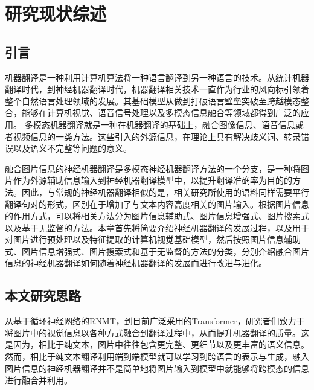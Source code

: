 \chapter{研究现状综述}\label{chap:relatedwork}

\section{引言}
机器翻译是一种利用计算机算法将一种语言翻译到另一种语言的技术。从统计机器翻译时代，到神经机器翻译时代，机器翻译相关技术一直作为行业的风向标引领着整个自然语言处理领域的发展。其基础模型从做到打破语言壁垒突破至跨越模态整合，能够在计算机视觉、语音信号处理以及多模态信息融合等领域都得到广泛的应用。
多模态机器翻译就是一种在机器翻译的基础上，融合图像信息、语音信息或者视频信息的一类方法。这些引入的外源信息，在理论上具有解决歧义词、转录错误以及语义不完整等问题的意义。

融合图片信息的神经机器翻译是多模态神经机器翻译方法的一个分支，是一种将图片作为外源辅助信息输入到神经机器翻译模型中，以提升翻译准确率为目的的方法。因此，与常规的神经机器翻译相似的是，相关研究所使用的语料同样需要平行翻译句对的形式，区别在于增加了与文本内容高度相关的图片输入。根据图片信息的作用方式，可以将相关方法分为图片信息辅助式、图片信息增强式、图片搜索式以及基于无监督的方法。本章首先将简要介绍神经机器翻译的发展过程，以及用于对图片进行预处理以及特征提取的计算机视觉基础模型，然后按照图片信息辅助式、图片信息增强式、图片搜索式和基于无监督的方法的分类，分别介绍融合图片信息的神经机器翻译如何随着神经机器翻译的发展而进行改进与进化。




%
%
%



\section{本文研究思路}
从基于循环神经网络的RNMT，到目前广泛采用的Transformer，研究者们致力于将图片中的视觉信息以各种方式融合到翻译过程中，从而提升机器翻译的质量。这是因为，相比于纯文本，图片中往往包含更完整、更细节以及更丰富的语义信息。然而，相比于纯文本翻译利用端到端模型就可以学习到跨语言的表示与生成，融入图片信息的神经机器翻译并不是简单地将图片输入到模型中就能够将跨模态的信息进行融合并利用。

